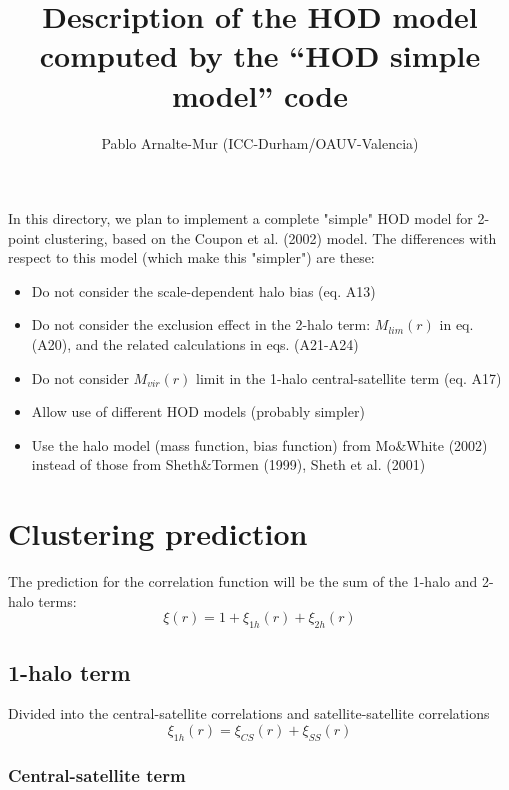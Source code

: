 \documentclass[10pt,a4paper]{article}
\title{Description of the HOD model computed by the ``HOD simple model'' code}
\author{Pablo Arnalte-Mur (ICC-Durham/OAUV-Valencia)}
\begin{document}
\maketitle

In this directory, we plan to implement a complete "simple" HOD model for 
2-point clustering, based on the Coupon et al. (2002) model. The differences
with respect to this model (which make this "simpler") are these:

\begin{itemize}

\item Do not consider the scale-dependent halo bias (eq. A13)
\item Do not consider the exclusion effect in the 2-halo term: $M_{lim}(r)$ in eq. (A20),
  and the related calculations in eqs. (A21-A24)
\item Do not consider $M_{vir}(r)$ limit in the 1-halo central-satellite term (eq. A17)
\item Allow use of different HOD models (probably simpler)
\item Use the halo model (mass function, bias function) from Mo\&White (2002) instead of those from Sheth\&Tormen (1999), Sheth et al. (2001)
\end{itemize}

\section{Clustering prediction}

The prediction for the correlation function will be the sum of the 1-halo and 2-halo terms:
\begin{equation}
\xi(r) = 1 + \xi_{1h}(r) + \xi_{2h}(r)
\end{equation}

\subsection{1-halo term}

Divided into the central-satellite correlations and satellite-satellite correlations
\begin{equation}
\xi_{1h}(r) = \xi_{CS}(r) + \xi_{SS}(r)
\end{equation}

\subsubsection{Central-satellite term}
\end{document}
